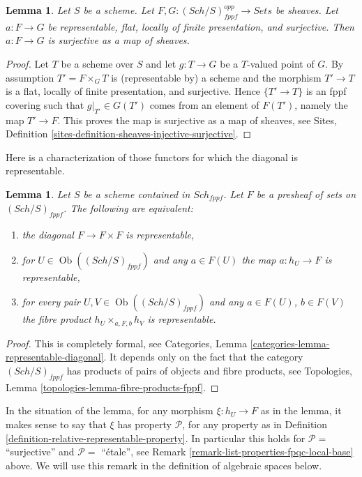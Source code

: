 \documentclass{stacks-project}
\theoremstyle{plain}
\newtheorem{lemma}[subsection]{Lemma}
\theoremstyle{definition}
\theoremstyle{remark}
\numberwithin{equation}{subsection}
\def\Sch{\mathit{Sch}}
\def\Ob{\mathop{\mathrm{Ob}}\nolimits}
\begin{document}
\begin{lemma}
\label{lemma-surjective-flat-locally-finite-presentation}
Let $S$ be a scheme.
Let $F, G : (\Sch/S)_{fppf}^{opp} \to \textit{Sets}$ be sheaves.
Let $a : F \to G$ be representable, flat,
locally of finite presentation, and surjective.
Then $a : F \to G$ is surjective as a map of sheaves.
\end{lemma}

\begin{proof}
Let $T$ be a scheme over $S$ and let $g : T \to G$ be a $T$-valued point of
$G$. By assumption $T' = F \times_G T$ is (representable by) a scheme and
the morphism $T' \to T$ is a flat, locally of finite presentation, and
surjective. Hence $\{T' \to T\}$ is an fppf covering such
that $g|_{T'} \in G(T')$ comes from an element of $F(T')$, namely
the map $T' \to F$. This proves the map is surjective as
a map of sheaves, see
Sites, Definition \ref{sites-definition-sheaves-injective-surjective}.
\end{proof}

\noindent
Here is a characterization of those functors for which the
diagonal is representable.

\begin{lemma}
\label{lemma-representable-diagonal}
Let $S$ be a scheme contained in $\Sch_{fppf}$.
Let $F$ be a presheaf of sets on $(\Sch/S)_{fppf}$.
The following are equivalent:
\begin{enumerate}
\item the diagonal $F \to F \times F$ is representable,
\item for $U \in \Ob((\Sch/S)_{fppf})$ and any $a \in F(U)$
the map $a : h_U \to F$ is representable,
\item for every pair $U, V \in \Ob((\Sch/S)_{fppf})$
and any $a \in F(U)$, $b \in F(V)$ the fibre product
$h_U \times_{a, F, b} h_V$ is representable.
\end{enumerate}
\end{lemma}

\begin{proof}
This is completely formal, see
Categories, Lemma \ref{categories-lemma-representable-diagonal}.
It depends only on the fact that the category $(\Sch/S)_{fppf}$
has products of pairs of objects and fibre products, see
Topologies, Lemma \ref{topologies-lemma-fibre-products-fppf}.
\end{proof}

\noindent
In the situation of the lemma, for any morphism
$\xi : h_U \to F$ as in the lemma, it makes sense
to say that $\xi$ has property $\mathcal{P}$, for any property
as in Definition \ref{definition-relative-representable-property}.
In particular this holds for $\mathcal{P} = $ ``surjective''
and $\mathcal{P} = $ ``\'etale'', see
Remark \ref{remark-list-properties-fpqc-local-base}
above. We will use this remark in the definition
of algebraic spaces below.
\end{document}
